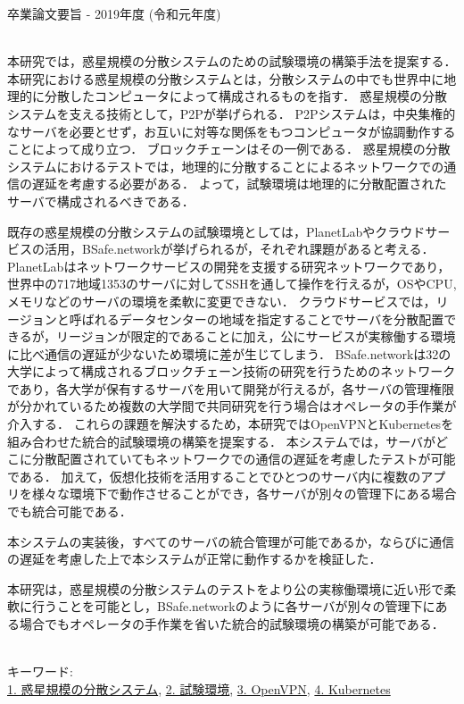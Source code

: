 卒業論文要旨 - 2019年度 (令和元年度)
\begin{center}
\begin{large}
\end{large}
\end{center}

~ \\
本研究では，惑星規模の分散システムのための試験環境の構築手法を提案する．
本研究における惑星規模の分散システムとは，分散システムの中でも世界中に地理的に分散したコンピュータによって構成されるものを指す．
惑星規模の分散システムを支える技術として，P2Pが挙げられる．
P2Pシステムは，中央集権的なサーバを必要とせず，お互いに対等な関係をもつコンピュータが協調動作することによって成り立つ．
ブロックチェーンはその一例である．
惑星規模の分散システムにおけるテストでは，地理的に分散することによるネットワークでの通信の遅延を考慮する必要がある．
よって，試験環境は地理的に分散配置されたサーバで構成されるべきである．

既存の惑星規模の分散システムの試験環境としては，PlanetLabやクラウドサービスの活用，BSafe.networkが挙げられるが，それぞれ課題があると考える．
PlanetLabはネットワークサービスの開発を支援する研究ネットワークであり，世界中の717地域1353のサーバに対してSSHを通して操作を行えるが，OSやCPU,メモリなどのサーバの環境を柔軟に変更できない．
クラウドサービスでは，リージョンと呼ばれるデータセンターの地域を指定することでサーバを分散配置できるが，リージョンが限定的であることに加え，公にサービスが実稼働する環境に比べ通信の遅延が少ないため環境に差が生じてしまう．
BSafe.networkは32の大学によって構成されるブロックチェーン技術の研究を行うためのネットワークであり，各大学が保有するサーバを用いて開発が行えるが，各サーバの管理権限が分かれているため複数の大学間で共同研究を行う場合はオペレータの手作業が介入する．
これらの課題を解決するため，本研究ではOpenVPNとKubernetesを組み合わせた統合的試験環境の構築を提案する．
本システムでは，サーバがどこに分散配置されていてもネットワークでの通信の遅延を考慮したテストが可能である．
加えて，仮想化技術を活用することでひとつのサーバ内に複数のアプリを様々な環境下で動作させることができ，各サーバが別々の管理下にある場合でも統合可能である．

本システムの実装後，すべてのサーバの統合管理が可能であるか，ならびに通信の遅延を考慮した上で本システムが正常に動作するかを検証した．

本研究は，惑星規模の分散システムのテストをより公の実稼働環境に近い形で柔軟に行うことを可能とし，BSafe.networkのように各サーバが別々の管理下にある場合でもオペレータの手作業を省いた統合的試験環境の構築が可能である．

~ \\
キーワード:\\
\underline{1. 惑星規模の分散システム},
\underline{2. 試験環境},
\underline{3. OpenVPN},
\underline{4. Kubernetes}

\begin{flushright}
\dept \\
\author
\end{flushright}
